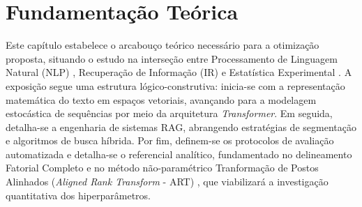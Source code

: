 \section{Fundamentação Teórica}

Este capítulo estabelece o arcabouço teórico necessário para a otimização proposta, situando o estudo na interseção entre Processamento de Linguagem Natural (NLP) \citep{jurafsky2024}, Recuperação de Informação (IR) \citep{manning2008} e Estatística Experimental \citep{montgomery2017}. A exposição segue uma estrutura lógico-construtiva: inicia-se com a representação matemática do texto em espaços vetoriais, avançando para a modelagem estocástica de sequências por meio da arquitetura \textit{Transformer}. Em seguida, detalha-se a engenharia de sistemas RAG, abrangendo estratégias de segmentação e algoritmos de busca híbrida. Por fim, definem-se os protocolos de avaliação automatizada e detalha-se o referencial analítico, fundamentado no delineamento Fatorial Completo e no método não-paramétrico Tranformação de Postos Alinhados (\textit{Aligned Rank Transform} - ART) \citep{wobbrock2011art}, que viabilizará a investigação quantitativa dos hiperparâmetros.

